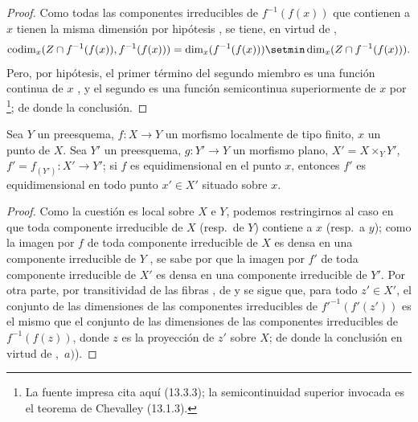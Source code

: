 \begin{proof}
Como todas las componentes irreducibles de $f^{-1}(f(x))$ que contienen a $x$ tienen la misma dimensión por hipótesis , se tiene, en virtud de ,
\[
  \operatorname{codim}_x(Z\cap f^{-1}(f(x)),f^{-1}(f(x)))=\dim_x(f^{-1}(f(x)))\setmin\dim_x(Z\cap f^{-1}(f(x))).
\]
Pero, por hipótesis, el primer término del segundo miembro es una función continua de $x$ , y el segundo es una función semicontinua superiormente de $x$ por \footnote{La fuente impresa cita aquí (13.3.3); la semicontinuidad superior invocada es el teorema de Chevalley (13.1.3).}; de donde la conclusión.
\end{proof}

\begin{proposition}[13.3.8]
\label{IV.13.3.8}
Sea $Y$ un preesquema, $f:X\to Y$ un morfismo localmente de tipo finito, $x$ un punto de $X$.
Sea $Y'$ un preesquema, $g:Y'\to Y$ un morfismo plano, $X'=X\times_Y Y'$, $f'=f_{(Y')}:X'\to Y'$; si $f$ es equidimensional en el punto $x$, entonces $f'$ es equidimensional en todo punto $x'\in X'$ situado sobre $x$.
\end{proposition}

\begin{proof}
Como la cuestión es local sobre $X$ e $Y$, podemos restringirnos al caso en que toda componente irreducible de $X$ (resp.\ de $Y$) contiene a $x$ (resp.\ a $y$); como la imagen por $f$ de toda componente irreducible de $X$ es densa en una componente irreducible de $Y$ , se sabe por  que la imagen por $f'$ de toda componente irreducible de $X'$ es densa en una componente irreducible de $Y'$.
Por otra parte, por transitividad de las fibras , de  y  se sigue que, para todo $z'\in X'$, el conjunto de las dimensiones de las componentes irreducibles de ${f'}^{-1}(f'(z'))$ es el mismo que el conjunto de las dimensiones de las componentes irreducibles de $f^{-1}(f(z))$, donde $z$ es la proyección de $z'$ sobre $X$; de donde la conclusión en virtud de ,~$a)$).
\end{proof}

